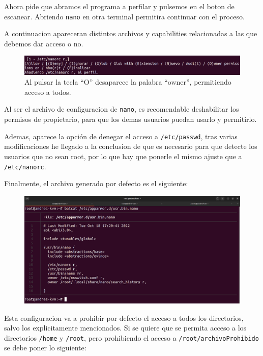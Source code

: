 \documentclass{article}
\begin{document}
Ahora pide que abramos el programa a perfilar y pulsemos en el boton de escanear. Abriendo \verb|nano| en otra terminal permitira continuar con el proceso.

\bigskip

A continuacion apareceran distintos archivos y capabilities relacionadas a las que debemos dar acceso o no.


\begin{figure}[H]
    \centering
    \includegraphics[width=\textwidth]{imagenes/Captura desde 2022-10-18 17-11-50.png}
    \caption{Al pulsar la tecla ``O'' desaparece la palabra ``owner'', permitiendo acceso a todos.}
\end{figure}

Al ser el archivo de configuracion de \verb|nano|, es recomendable deshabilitar los permisos de propietario, para que los demas usuarios puedan usarlo y permitirlo.

\bigskip

Ademas, aparece la opción de denegar el acceso a \verb|/etc/passwd|, tras varias modificaciones he llegado a la conclusion de que es necesario para que detecte los usuarios que no sean root, por lo que hay que ponerle el mismo ajuste que a \verb|/etc/nanorc|.

\bigskip

Finalmente, el archivo generado por defecto es el siguiente:
\begin{figure}[H]
    \centering
    \includegraphics[width=\textwidth]{imagenes/Captura desde 2022-10-18 17-23-45.png}
\end{figure}

Esta configuracion va a prohibir por defecto el acceso a todos los directorios, salvo los explicitamente mencionados. Si se quiere que se permita acceso a los directorios \verb|/home| y \verb|/root|, pero prohibiendo el acceso a \verb|/root/archivoProhibido| se debe poner lo siguiente:
\end{document}
